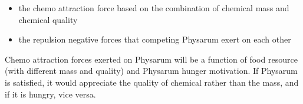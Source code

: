 \begin{itemize}
	\item the chemo attraction force based on the combination of chemical mass and chemical quality
	\item the repulsion negative forces that competing Physarum exert on each other
\end{itemize}

Chemo attraction forces exerted on Physarum will be a function of food resource (with different mass and quality) and Physarum hunger motivation. If Physarum is satisfied, it would appreciate the quality of chemical rather than the mass, and if it is hungry, vice versa.


